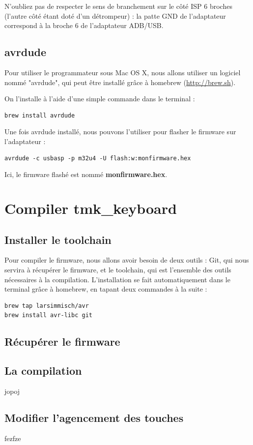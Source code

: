 \documentclass[12pt,a4paper,final]{article}
\begin{document}
N'oubliez pas de respecter le sens de branchement sur le côté ISP 6 broches (l'autre côté étant doté d'un détrompeur) : la patte GND de l'adaptateur correspond à la broche 6 de l'adaptateur ADB/USB.

\subsection{avrdude}

Pour utiliser le programmateur sous Mac OS X, nous allons utiliser un logiciel nommé "avrdude", qui peut être installé grâce à homebrew (\url{http://brew.sh}).

On l'installe à l'aide d'une simple commande dans le terminal :

\begin{verbatim}
brew install avrdude
\end{verbatim}

Une fois avrdude installé, nous pouvons l'utiliser pour flasher le firmware sur l'adaptateur :

\begin{verbatim}
avrdude -c usbasp -p m32u4 -U flash:w:monfirmware.hex
\end{verbatim}

Ici, le firmware flashé est nommé \textbf{monfirmware.hex}.

\section{Compiler tmk\_keyboard}

\subsection{Installer le toolchain}

Pour compiler le firmware, nous allons avoir besoin de deux outils : Git, qui nous servira à récupérer le firmware, et le toolchain, qui est l'ensemble des outils nécessaires à la compilation.
L'installation se fait automatiquement dans le terminal grâce à homebrew, en tapant deux commandes à la suite :

\begin{verbatim}
brew tap larsimmisch/avr
brew install avr-libc git
\end{verbatim}

\subsection{Récupérer le firmware}



\subsection{La compilation}

jopoj

\subsection{Modifier l'agencement des touches}

fezfze
\end{document}
